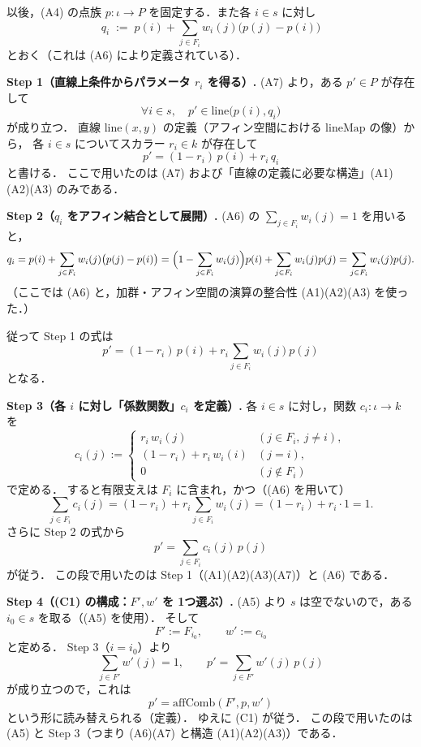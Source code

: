 \documentclass[a4paper,12pt]{bxjsbook}
\makeatletter
\newlength{\customindent}
\theoremstyle{theorem}
\renewenvironment{proof}[1][\proofname]{%
  \par\pushQED{\qed}%
  \normalfont
  \topsep6\p@\@plus6\p@\relax
  \list{}{%
    \leftmargin=\customindent
    \rightmargin=0pt
    \labelwidth=0pt
    \labelsep=0pt
    \itemindent=0pt
    \listparindent=0pt
    \parsep=0pt
  }%
  \item[\itshape #1\@addpunct{.}\hspace{0.5em}]%
  \setlength{\displayindent}{\customindent}%
  \setlength{\displaywidth}{\dimexpr\linewidth-\customindent\relax}%
  \ignorespaces
}{%
  \popQED\endlist\@endpefalse
}
\makeatother
\begin{document}
    \begin{proof}
        以後，(A4) の点族 $p:\iota\to P$ を固定する．また各 $i\in s$ に対し
        \[
        q_i \;:=\; p(i)+\sum_{j\in F_i} w_i(j)\bigl(p(j)-p(i)\bigr)
        \]
        とおく（これは (A6) により定義されている）．
  
        \medskip
        \noindent\textbf{Step 1（直線上条件からパラメータ $r_i$ を得る）.}
        (A7) より，ある $p'\in P$ が存在して
        \[
        \forall i\in s,\quad p'\in \mathrm{line}\bigl(p(i),q_i\bigr)
        \]
        が成り立つ．
        直線 $\mathrm{line}(x,y)$ の定義（アフィン空間における $\mathrm{lineMap}$ の像）から，
        各 $i\in s$ についてスカラー $r_i\in k$ が存在して
        \[
        p'=(1-r_i)\,p(i)+r_i\,q_i
        \]
        と書ける．
        ここで用いたのは (A7) および「直線の定義に必要な構造」(A1)(A2)(A3) のみである．
  
        \medskip
        \noindent\textbf{Step 2（$q_i$ をアフィン結合として展開）.}
        (A6) の $\sum_{j\in F_i} w_i(j)=1$ を用いると，
        \[
        q_i
        =p(i)+\sum_{j\in F_i} w_i(j)\bigl(p(j)-p(i)\bigr)
        =\Bigl(1-\sum_{j\in F_i}w_i(j)\Bigr)p(i)+\sum_{j\in F_i}w_i(j)p(j)
        =\sum_{j\in F_i}w_i(j)p(j).
        \]
        （ここでは (A6) と，加群・アフィン空間の演算の整合性 (A1)(A2)(A3) を使った．）
  
        従って Step 1 の式は
        \[
        p'=(1-r_i)\,p(i)+r_i\sum_{j\in F_i}w_i(j)p(j)
        \]
        となる．
  
        \medskip
        \noindent\textbf{Step 3（各 $i$ に対し「係数関数」$c_i$ を定義）.}
        各 $i\in s$ に対し，関数 $c_i:\iota\to k$ を
        \[
        c_i(j):=
        \begin{cases}
            r_i\,w_i(j) & (j\in F_i,\ j\neq i),\\
            (1-r_i)+r_i\,w_i(i) & (j=i),\\
            0 & (j\notin F_i)
        \end{cases}
        \]
        で定める．
        すると有限支えは $F_i$ に含まれ，かつ（(A6) を用いて）
        \[
        \sum_{j\in F_i}c_i(j)
        =(1-r_i)+r_i\sum_{j\in F_i}w_i(j)
        =(1-r_i)+r_i\cdot 1
        =1.
        \]
        さらに Step 2 の式から
        \[
        p'=\sum_{j\in F_i}c_i(j)\,p(j)
        \]
        が従う．
        この段で用いたのは Step 1（(A1)(A2)(A3)(A7)）と (A6) である．
  
        \medskip
        \noindent\textbf{Step 4（(C1) の構成：$F',w'$ を 1つ選ぶ）.}
        (A5) より $s$ は空でないので，ある $i_0\in s$ を取る（(A5) を使用）．
        そして
        \[
        F':=F_{i_0},\qquad w':=c_{i_0}
        \]
        と定める．
        Step 3（$i=i_0$）より
        \[
        \sum_{j\in F'}w'(j)=1,\qquad
        p'=\sum_{j\in F'}w'(j)\,p(j)
        \]
        が成り立つので，これは
        \[
        p'=\mathrm{affComb}(F',p,w')
        \]
        という形に読み替えられる（定義）．
        ゆえに (C1) が従う．
        この段で用いたのは (A5) と Step 3（つまり (A6)(A7) と構造 (A1)(A2)(A3)）である．
  

\end{proof}
\end{document}
